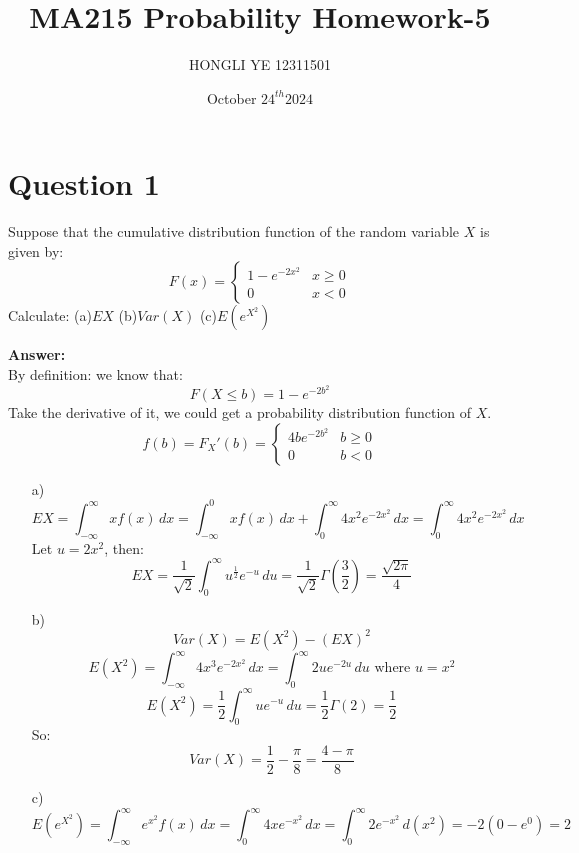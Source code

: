 \documentclass[hidelinks]{article}
\title{\textbf{MA215 Probability Homework-5}}
\author{HONGLI YE 12311501}
\date{October $24^{th} 2024$}
\begin{document}
\hypersetup{bookmarksnumbered=true,}
\pagecolor{white}
\color{black}
\maketitle


\SetAlgoNoLine %
\SetAlgoNoEnd %

\begin{Large}
\tableofcontents
\end{Large}%
\pagebreak

\section{Question 1}
Suppose that the cumulative distribution function of the random variable $X$ is given
by:
\[
F(x) = 
\begin{cases}
    1 - e^{-2x^2} & x \geq 0 \\
    0 & x < 0
\end{cases}
\]
Calculate: (a)$EX$ (b)$Var(X)$ (c)$E(e^{X^2})$

\textbf{Answer:}\\
By definition: we know that:
$$ F(X \leq b) = 1 - e^{-2b^2} $$
Take the derivative of it, we could get a probability distribution function of $X$.
\[f(b) = F_X'(b) = 
\begin{cases}
    4be^{-2b^2} & b \geq 0\\
    0 & b < 0
\end{cases} \]
\begin{enumerate}
    \item[a)] $$ EX = \int_{-\infty}^{\infty} xf(x) \, dx = \int_{-\infty}^{0} xf(x) \, dx + \int_{0}^{\infty} 4x^2e^{-2x^2} \, dx = \int_{0}^{\infty} 4x^2e^{-2x^2} \, dx$$
    Let $u = 2x^2$, then:
    $$ EX = \frac{1}{\sqrt{2}}\int_{0}^{\infty} u^{\frac{1}{2}}e^{-u} \, du = \frac{1}{\sqrt{2}} \Gamma(\frac{3}{2}) = \frac{\sqrt{2\pi}}{4}$$
    \item[b)] $$ Var(X) = E(X^2) - (EX)^2$$
    $$ E(X^2) = \int_{-\infty}^{\infty} 4x^3e^{-2x^2} \, dx = \int_{0}^{\infty} 2ue^{-2u} \, du \text{ where } u = x^2$$
    $$ E(X^2) = \frac{1}{2}\int_{0}^{\infty} ue^{-u} \, du = \frac{1}{2}\Gamma(2) = \frac{1}{2}$$
    So:
    $$ Var(X) = \frac{1}{2} - \frac{\pi}{8} = \frac{4-\pi}{8}$$
    \item[c)] $$ E(e^{X^2}) =  \int_{-\infty}^{\infty} e^{x^2}f(x) \, dx =  \int_{0}^{\infty} 4xe^{-x^2} \, dx = \int_{0}^{\infty} 2e^{-x^2} \, d(x^2) = -2(0 - e^0) = 2$$
\end{enumerate}
\end{document}
